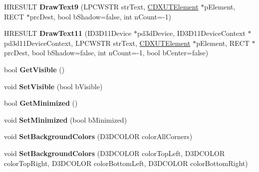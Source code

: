 \begin{DoxyCompactItemize}
\item 
\hypertarget{class_c_d_x_u_t_dialog_a5ee53982c58547c9b2053418d182cb52}{H\+R\+E\+S\+U\+L\+T {\bfseries Draw\+Text9} (L\+P\+C\+W\+S\+T\+R str\+Text, \hyperlink{class_c_d_x_u_t_element}{C\+D\+X\+U\+T\+Element} $\ast$p\+Element, R\+E\+C\+T $\ast$prc\+Dest, bool b\+Shadow=false, int n\+Count=-\/1)}\label{class_c_d_x_u_t_dialog_a5ee53982c58547c9b2053418d182cb52}

\item 
\hypertarget{class_c_d_x_u_t_dialog_af52a64fa226ceef24aa8e27260dc69e8}{H\+R\+E\+S\+U\+L\+T {\bfseries Draw\+Text11} (I\+D3\+D11\+Device $\ast$pd3d\+Device, I\+D3\+D11\+Device\+Context $\ast$pd3d11\+Device\+Context, L\+P\+C\+W\+S\+T\+R str\+Text, \hyperlink{class_c_d_x_u_t_element}{C\+D\+X\+U\+T\+Element} $\ast$p\+Element, R\+E\+C\+T $\ast$prc\+Dest, bool b\+Shadow=false, int n\+Count=-\/1, bool b\+Center=false)}\label{class_c_d_x_u_t_dialog_af52a64fa226ceef24aa8e27260dc69e8}

\item 
\hypertarget{class_c_d_x_u_t_dialog_ad80a66dea701bdedee8c3e7ff0ba76db}{bool {\bfseries Get\+Visible} ()}\label{class_c_d_x_u_t_dialog_ad80a66dea701bdedee8c3e7ff0ba76db}

\item 
\hypertarget{class_c_d_x_u_t_dialog_aa390f99d291ba0acb73a01dbb7add794}{void {\bfseries Set\+Visible} (bool b\+Visible)}\label{class_c_d_x_u_t_dialog_aa390f99d291ba0acb73a01dbb7add794}

\item 
\hypertarget{class_c_d_x_u_t_dialog_a67ac00efe88bc892a832d000960be4b6}{bool {\bfseries Get\+Minimized} ()}\label{class_c_d_x_u_t_dialog_a67ac00efe88bc892a832d000960be4b6}

\item 
\hypertarget{class_c_d_x_u_t_dialog_a464452e6d763a09a896a5f51c20e8011}{void {\bfseries Set\+Minimized} (bool b\+Minimized)}\label{class_c_d_x_u_t_dialog_a464452e6d763a09a896a5f51c20e8011}

\item 
\hypertarget{class_c_d_x_u_t_dialog_a787ba45509239dc186d2632984e52bb9}{void {\bfseries Set\+Background\+Colors} (D3\+D\+C\+O\+L\+O\+R color\+All\+Corners)}\label{class_c_d_x_u_t_dialog_a787ba45509239dc186d2632984e52bb9}

\item 
\hypertarget{class_c_d_x_u_t_dialog_a21a0a60808aacbe1af926d3b49589a18}{void {\bfseries Set\+Background\+Colors} (D3\+D\+C\+O\+L\+O\+R color\+Top\+Left, D3\+D\+C\+O\+L\+O\+R color\+Top\+Right, D3\+D\+C\+O\+L\+O\+R color\+Bottom\+Left, D3\+D\+C\+O\+L\+O\+R color\+Bottom\+Right)}\label{class_c_d_x_u_t_dialog_a21a0a60808aacbe1af926d3b49589a18}


\end{DoxyCompactItemize}
